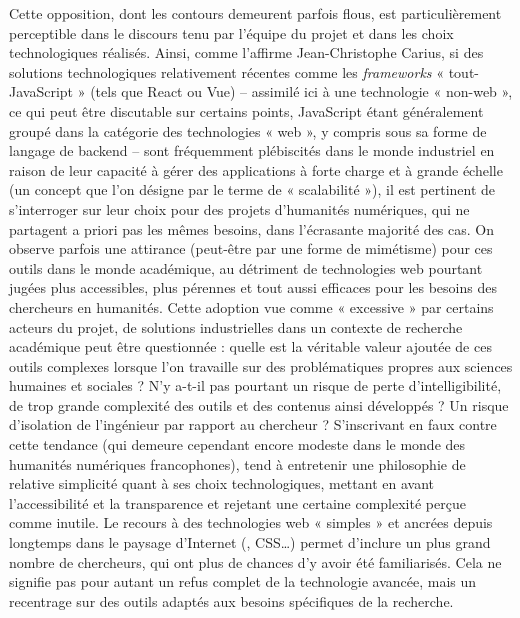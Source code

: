 Cette opposition, dont les contours demeurent parfois flous, est particulièrement perceptible dans le discours tenu par l’équipe du projet et dans les choix technologiques réalisés. 
Ainsi, comme l’affirme Jean-Christophe Carius, si des solutions technologiques relativement récentes comme les \textit{frameworks} « tout-JavaScript » (tels que React ou Vue) – assimilé ici à une technologie « non-web », ce qui peut être discutable sur certains points, JavaScript étant généralement groupé dans la catégorie des technologies « web », y compris sous sa forme de langage de backend – sont fréquemment plébiscités dans le monde industriel en raison de leur capacité à gérer des applications à forte charge et à grande échelle (un concept que l’on désigne par le terme de « scalabilité »), il est pertinent de s'interroger sur leur choix pour des projets d’humanités numériques, qui ne partagent a priori pas les mêmes besoins, dans l’écrasante majorité des cas.  On observe parfois une attirance (peut-être par une forme de mimétisme) pour ces outils dans le monde académique, au détriment de technologies web pourtant jugées plus accessibles, plus pérennes et tout aussi efficaces pour les besoins des chercheurs en humanités. 
Cette adoption vue comme « excessive » par certains acteurs du projet, de solutions industrielles dans un contexte de recherche académique peut être questionnée : quelle est la véritable valeur ajoutée de ces outils complexes lorsque l’on travaille sur des problématiques propres aux sciences humaines et sociales ? N’y a-t-il pas pourtant un risque de perte d’intelligibilité, de trop grande complexité des outils et des contenus ainsi développés ?  Un risque d’isolation de l’ingénieur par rapport au chercheur ?
S’inscrivant en faux contre cette tendance (qui demeure cependant encore modeste dans le monde des humanités numériques francophones), \pense tend à entretenir une philosophie de relative simplicité quant à ses choix technologiques, mettant en avant l’accessibilité et la transparence et rejetant une certaine complexité perçue comme inutile. Le recours à des technologies web « simples » et ancrées depuis longtemps dans le paysage d’Internet (\html, CSS…) permet d’inclure un plus grand nombre de chercheurs, qui ont plus de chances d’y avoir été familiarisés. Cela ne signifie pas pour autant un refus complet de la technologie avancée, mais un recentrage sur des outils adaptés aux besoins spécifiques de la recherche.

